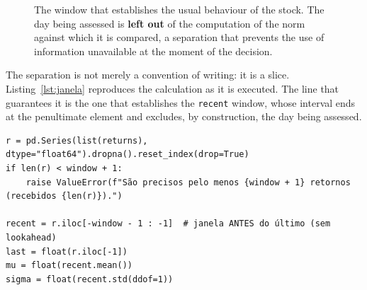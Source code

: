 \begin{figure}[htbp]
\centering
{}
\caption[The rolling window of the \emph{z}-score]{The window that establishes the usual behaviour
of the stock. The day being assessed is \textbf{left out} of the computation of the norm against
which it is compared, a separation that prevents the use of information unavailable at the moment
of the decision.}
\label{fig:met_janela}
\end{figure}

The separation is not merely a convention of writing: it is a slice.
Listing~\ref{lst:janela} reproduces the calculation as it is executed. The line that
guarantees it is the one that establishes the \texttt{recent} window, whose interval ends at the
penultimate element and excludes, by construction, the day being assessed.

\begin{lstlisting}[caption={[The window that excludes the day assessed]The window that
excludes the day assessed. The interval \texttt{[-window-1:-1]} ends before the last element,
so the return of the day under assessment does not enter the mean or the standard deviation
against which it is compared. The body of the detection function is reproduced, without the
indentation it carries in the source file. The comment is in the original.}, label={lst:janela}, float=htbp]
r = pd.Series(list(returns), dtype="float64").dropna().reset_index(drop=True)
if len(r) < window + 1:
    raise ValueError(f"São precisos pelo menos {window + 1} retornos (recebidos {len(r)}).")

recent = r.iloc[-window - 1 : -1]  # janela ANTES do último (sem lookahead)
last = float(r.iloc[-1])
mu = float(recent.mean())
sigma = float(recent.std(ddof=1))
\end{lstlisting}


